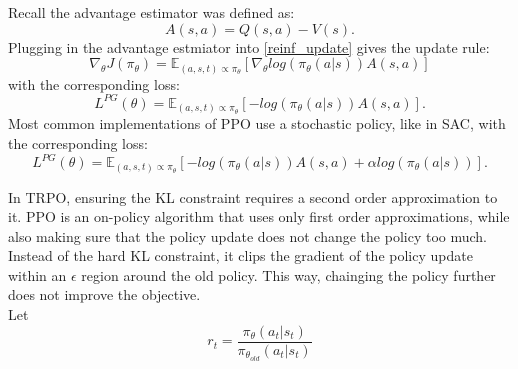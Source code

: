 Recall the advantage estimator was defined as:
\begin{equation}
    A(s,a) = Q(s,a) - V(s).
\end{equation}
Plugging in the advantage estmiator into \ref{reinf_update} gives the update rule:
\begin{equation}
    \nabla_{\theta} J(\pi_{\theta}) = \mathbb{E}_{(a, s, t) \propto \pi_{\theta}}[\nabla_{\theta} log(\pi_{\theta}(a|s))A(s,a)]
\end{equation}
with the corresponding loss:
\begin{equation}
    \label{LPG}
    L^{PG}(\theta) = \mathbb{E}_{(a, s, t) \propto \pi_{\theta}}[-log(\pi_{\theta}(a|s))A(s,a)].
\end{equation}
Most common implementations of PPO use a stochastic policy, like in SAC, with the corresponding loss:
\begin{equation}
    \label{PPO_Loss_Reg}
    L^{PG}(\theta) = \mathbb{E}_{(a, s, t) \propto \pi_{\theta}}[-log(\pi_{\theta}(a|s))A(s,a)+\alpha log(\pi_{\theta}(a|s))].
\end{equation}

In TRPO, ensuring the KL constraint requires a second order approximation to it. PPO is an on-policy algorithm that uses only first order approximations, while 
also making sure that the policy update does not change the policy too much. Instead of the hard KL constraint, it clips the gradient of the policy update within 
an $\epsilon$ region around the old policy. This way, chainging the policy further does not improve the objective.\\
Let
\begin{equation}
    r_t = \frac{\pi_{\theta}(a_t|s_t)}{\pi_{\theta_{old}}(a_t|s_t)}
\end{equation}

